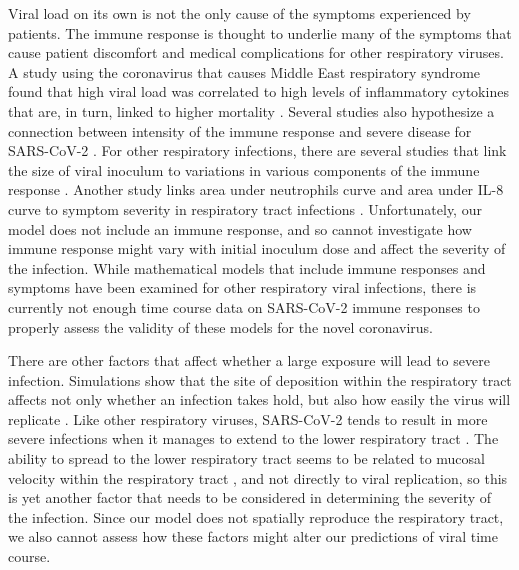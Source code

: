 Viral load on its own is not the only cause of the symptoms experienced by patients. The immune response is thought to underlie many of the symptoms that cause patient discomfort \cite{hijano19} and medical complications \cite{xu19} for other respiratory viruses. A study using the coronavirus that causes Middle East respiratory syndrome found that high viral load was correlated to high levels of inflammatory cytokines that are, in turn, linked to higher mortality \cite{alosaimi20}. Several studies also hypothesize a connection between intensity of the immune response and severe disease for SARS-CoV-2 \cite{lin20,cao20path,zhu20cardio}. For other respiratory infections, there are several studies that link the size of viral inoculum to variations in various components of the immune response \cite{go19, littwitz17, handel18, redeker14, anderson10}. Another study links area under neutrophils curve and area under IL-8 curve to symptom severity in respiratory tract infections \cite{henriquez15}. Unfortunately, our model does not include an immune response, and so cannot investigate how immune response might vary with initial inoculum dose and affect the severity of the infection. While mathematical models that include immune responses \cite{dobrovolny13} and symptoms \cite{canini11,price15} have been examined for other respiratory viral infections, there is currently not enough time course data on SARS-CoV-2 immune responses to properly assess the validity of these models for the novel coronavirus.  

There are other factors that affect whether a large exposure will lead to severe infection. Simulations show that the site of deposition within the respiratory tract affects not only whether an infection takes hold, but also how easily the virus will replicate \cite{haghnegahdar19}. Like other respiratory viruses, SARS-CoV-2 tends to result in more severe infections when it manages to extend to the lower respiratory tract \cite{COVID20}. The ability to spread to the lower respiratory tract seems to be related to mucosal velocity within the respiratory tract \cite{gonzalez19,quirouette20}, and not directly to viral replication, so this is yet another factor that needs to be considered in determining the severity of the infection. Since our model does not spatially reproduce the respiratory tract, we also cannot assess how these factors might alter our predictions of viral time course.

